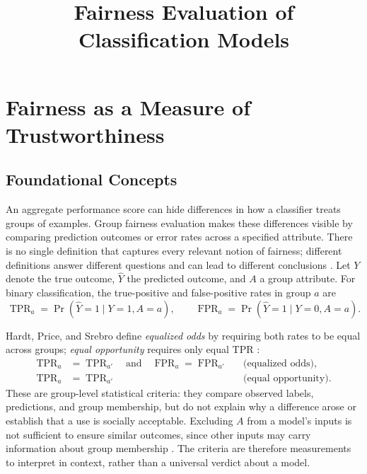 \documentclass[12pt,a4paper]{article}
\title{Fairness Evaluation of Classification Models}
\author{}
\date{}
\begin{document}
\maketitle

\section{Fairness as a Measure of Trustworthiness}

\subsection{Foundational Concepts}

An aggregate performance score can hide differences in how a classifier treats groups of examples. Group fairness evaluation makes these differences visible by comparing prediction outcomes or error rates across a specified attribute. There is no single definition that captures every relevant notion of fairness; different definitions answer different questions and can lead to different conclusions \cite{verma2018}. Let $Y$ denote the true outcome, $\widehat{Y}$ the predicted outcome, and $A$ a group attribute. For binary classification, the true-positive and false-positive rates in group $a$ are
\begin{equation}
    \operatorname{TPR}_a=\Pr(\widehat{Y}=1\mid Y=1,A=a),
    \qquad
    \operatorname{FPR}_a=\Pr(\widehat{Y}=1\mid Y=0,A=a).
    \label{eq:group-error-rates}
\end{equation}

Hardt, Price, and Srebro define \emph{equalized odds} by requiring both rates to be equal across groups; \emph{equal opportunity} requires only equal TPR \cite{hardt2016}:
\begin{align}
    \operatorname{TPR}_a&=\operatorname{TPR}_{a'}
    \quad\text{and}\quad
    \operatorname{FPR}_a=\operatorname{FPR}_{a'}
    &&\text{(equalized odds)}, \label{eq:equalized-odds}\\
    \operatorname{TPR}_a&=\operatorname{TPR}_{a'}
    &&\text{(equal opportunity)}. \label{eq:equal-opportunity}
\end{align}
These are group-level statistical criteria: they compare observed labels, predictions, and group membership, but do not explain why a difference arose or establish that a use is socially acceptable. Excluding $A$ from a model's inputs is not sufficient to ensure similar outcomes, since other inputs may carry information about group membership \cite{hardt2016}. The criteria are therefore measurements to interpret in context, rather than a universal verdict about a model.
\end{document}
